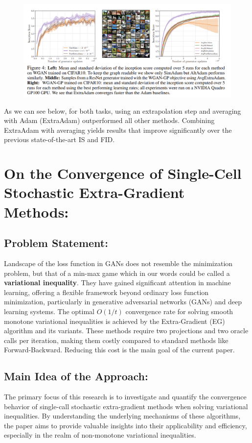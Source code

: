 \documentclass[11pt]{article}
\begin{document}
\begin{enumerate}
\begin{figure}[!htb]
			\label{fig:lab}
		\end{figure}
		\begin{figure}[!htb]
			\centering
			\includegraphics[scale=1]{pictures/pic5.png}
			\label{fig:l}
		\end{figure}
		
		As we can see below, for both tasks, using an extrapolation step and averaging with Adam (ExtraAdam) outperformed all other methods. Combining ExtraAdam with averaging yields results that improve significantly over the previous state-of-the-art IS and FID.
	\end{enumerate}

\section{On the Convergence of Single-Cell Stochastic Extra-Gradient Methods:}

	\subsection{Problem Statement:}
        Landscape of the loss function in GANs does not resemble the minimization problem, but that of a min-max game which in our words could be called a \textbf{variational inequality}. They have gained significant attention in machine learning, offering a flexible framework beyond ordinary loss function minimization, particularly in generative adversarial networks (GANs) and deep learning systems. The optimal $O(1/t)$ convergence rate for solving smooth monotone variational inequalities is achieved by the Extra-Gradient (EG) algorithm and its variants. These methods require two projections and two oracle calls per iteration, making them costly compared to standard methods like Forward-Backward. Reducing this cost is the main goal of the current paper.
	
	\subsection{Main Idea of the Approach:}
        The primary focus of this research is to investigate and quantify the convergence behavior of single-call stochastic extra-gradient methods when solving variational inequalities. By understanding the underlying mechanisms of these algorithms, the paper aims to provide valuable insights into their applicability and efficiency, especially in the realm of non-monotone variational inequalities.
	
\end{document}
